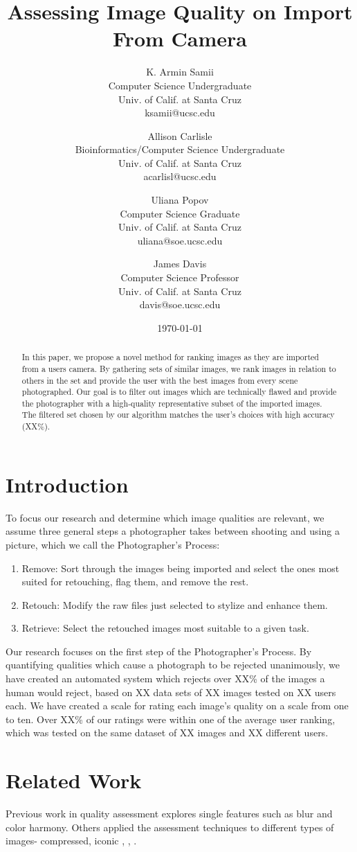 \documentclass[twocolumn]{article}
\title{
Assessing Image Quality on Import From Camera
} %
\author{
K. Armin Samii\\
Computer Science Undergraduate\\
Univ. of Calif. at Santa Cruz\\
ksamii@ucsc.edu
\and
Allison Carlisle\\
Bioinformatics/Computer Science Undergraduate\\
Univ. of Calif. at Santa Cruz\\
acarlisl@ucsc.edu
\and
Uliana Popov\\
Computer Science Graduate\\
Univ. of Calif. at Santa Cruz\\
uliana@soe.ucsc.edu
\and
James Davis\\
Computer Science Professor\\
Univ. of Calif. at Santa Cruz\\
davis@soe.ucsc.edu
}
\date{\today}
\begin{document}
\maketitle
\begin{abstract}
In this paper, we propose a novel method for ranking images as they are imported from a users camera. By gathering sets of similar images, we rank images in relation to others in the set and provide the user with the best images from every scene photographed. Our goal is to filter out images which are technically flawed and provide the photographer with a high-quality representative subset of the imported images. The filtered set chosen by our algorithm matches the user's choices with high accuracy (XX\%).
\end{abstract}

\section{Introduction}
To focus our research and determine which image qualities are relevant, we assume three general steps a photographer takes between shooting and using a picture, which we call the Photographer's Process:
\begin{enumerate}
\item Remove: Sort through the images being imported and select the ones most suited for retouching, flag them, and remove the rest.
\item Retouch: Modify the raw files just selected to stylize and enhance them.
\item Retrieve: Select the retouched images most suitable to a given task.
\end{enumerate}
Our research focuses on the first step of the Photographer's Process. By quantifying qualities which cause a photograph to be rejected unanimously, we have created an automated system which rejects over XX\% of the images a human would reject, based on XX data sets of XX images tested on XX users each. We have created a scale for rating each image's quality on a scale from one to ten. Over XX\% of our ratings were within one of the average user ranking, which was tested on the same dataset of XX images and XX different users.

\section{Related Work}
Previous work in quality assessment explores single features such as blur\cite{springerlink:10.1007/978-3-540-77409-9_26} and color harmony\cite{COL:COL5080160410}\cite{COL:COL10004}. Others applied the assessment techniques to different types of images- compressed, iconic \cite{477498} \cite{1038064}, \cite{1284395}, \cite{Berg:EECS-2007-13}.
\end{document}
